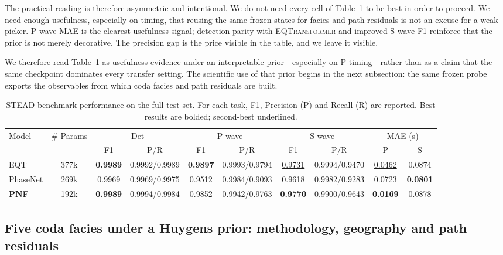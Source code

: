 \documentclass[twocolumn,10pt]{article}
\newcommand{\stead}{\textsc{STEAD}}
\newcommand{\eqt}{\textsc{EQTransformer}}
\begin{document}
The practical reading is therefore asymmetric and intentional. We do not need
every cell of Table~\ref{tab:stead} to be best in order to proceed. We need
enough usefulness, especially on timing, that reusing the same frozen states for
facies and path residuals is not an excuse for a weak picker. P-wave MAE is the
clearest usefulness signal; detection parity with \eqt{} and improved S-wave F1
reinforce that the prior is not merely decorative. The precision gap is the price
visible in the table, and we leave it visible.

We therefore read Table~\ref{tab:stead} as usefulness evidence under an
interpretable prior---especially on P timing---rather than as a claim that the
same checkpoint dominates every transfer setting. The scientific use of that
prior begins in the next subsection: the same frozen probe exports the
observables from which coda facies and path residuals are built.

\begin{table}[t]
\centering
\caption{\stead{} benchmark performance on the full test set.
For each task, F1, Precision (P) and Recall (R) are reported.
Best results are bolded; second-best underlined.}
\label{tab:stead}
\begin{tabular}{l c c c c c c c c c}
\toprule
\multirow{2}{*}{Model} & \multirow{2}{*}{\# Params}
 & \multicolumn{2}{c}{Det}
 & \multicolumn{2}{c}{P-wave}
 & \multicolumn{2}{c}{S-wave}
 & \multicolumn{2}{c}{MAE (s)} \\
\cmidrule(lr){3-4}\cmidrule(lr){5-6}\cmidrule(lr){7-8}\cmidrule(lr){9-10}
 & & F1 & P/R & F1 & P/R & F1 & P/R & P & S \\
\midrule
EQT & 377k
 & \textbf{0.9989} & 0.9992/0.9989
 & \textbf{0.9897} & 0.9993/0.9794
 & \underline{0.9731} & 0.9994/0.9470
 & \underline{0.0462} & 0.0874 \\
PhaseNet & 269k
 & 0.9969 & 0.9969/0.9975
 & 0.9512 & 0.9984/0.9093
 & 0.9618 & 0.9982/0.9283
 & 0.0723 & \textbf{0.0801} \\
\textbf{PNF} & 192k
 & \textbf{0.9989} & 0.9994/0.9984
 & \underline{0.9852} & 0.9942/0.9763
 & \textbf{0.9770} & 0.9900/0.9643
 & \textbf{0.0169} & \underline{0.0878} \\
\bottomrule
\end{tabular}
\end{table}

\subsection*{Five coda facies under a Huygens prior: methodology, geography and path residuals}
\end{document}

